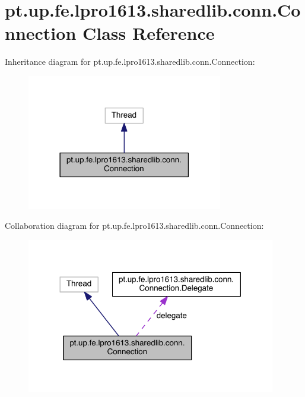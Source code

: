 \hypertarget{classpt_1_1up_1_1fe_1_1lpro1613_1_1sharedlib_1_1conn_1_1_connection}{}\section{pt.\+up.\+fe.\+lpro1613.\+sharedlib.\+conn.\+Connection Class Reference}
\label{classpt_1_1up_1_1fe_1_1lpro1613_1_1sharedlib_1_1conn_1_1_connection}


Inheritance diagram for pt.\+up.\+fe.\+lpro1613.\+sharedlib.\+conn.\+Connection\+:
\nopagebreak
\begin{figure}[H]
\begin{center}
\leavevmode
\includegraphics[width=242pt]{classpt_1_1up_1_1fe_1_1lpro1613_1_1sharedlib_1_1conn_1_1_connection__inherit__graph}
\end{center}
\end{figure}


Collaboration diagram for pt.\+up.\+fe.\+lpro1613.\+sharedlib.\+conn.\+Connection\+:
\nopagebreak
\begin{figure}[H]
\begin{center}
\leavevmode
\includegraphics[width=308pt]{classpt_1_1up_1_1fe_1_1lpro1613_1_1sharedlib_1_1conn_1_1_connection__coll__graph}
\end{center}
\end{figure}
